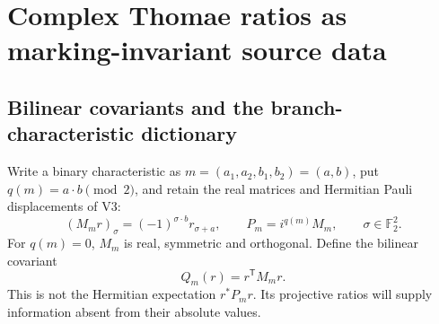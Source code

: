 \documentclass[11pt]{article}
\theoremstyle{definition}
\theoremstyle{remark}
\newcommand{\F}{\mathbb F}
\begin{document}
\section{Complex Thomae ratios as marking-invariant source data}
\label{sec:v4-complex-thomae}

\subsection{Bilinear covariants and the branch-characteristic dictionary}

Write a binary characteristic as $m=(a_1,a_2,b_1,b_2)=(a,b)$, put
$q(m)=a\cdot b\pmod2$, and retain the real matrices and Hermitian
Pauli displacements of V3:
\begin{equation}
 (M_m r)_\sigma=(-1)^{\sigma\cdot b}r_{\sigma+a},
 \qquad P_m=i^{q(m)}M_m,
 \qquad \sigma\in\F_2^2.
 \label{eq:v4-real-pauli}
\end{equation}
For $q(m)=0$, $M_m$ is real, symmetric and orthogonal. Define the
bilinear covariant
\begin{equation}
 Q_m(r)=r^{\mathsf T}M_mr.
 \label{eq:v4-bilinear}
\end{equation}
This is not the Hermitian expectation $r^*P_mr$. Its projective ratios will
supply information absent from their absolute values.
\end{document}
